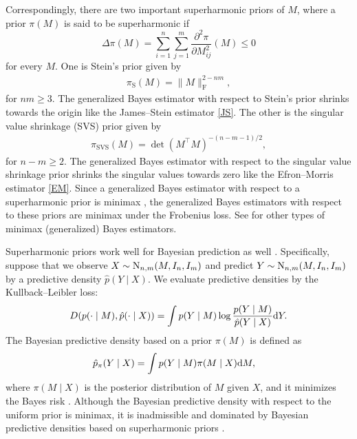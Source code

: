 \documentclass[11pt, a4paper]{article}
\theoremstyle{remark}
\begin{document}
Correspondingly, there are two important superharmonic priors of $M$, where a prior $\pi(M)$ is said to be superharmonic if
\[
    \Delta \pi (M) = \sum_{i=1}^n \sum_{j=1}^m \frac{\partial^2 \pi}{\partial M_{ij}^2} (M) \leq 0
\]
for every $M$.
One is Stein's prior \citep{stein1974estimation} given by
\begin{align}
\pi_{\mathrm{S}}(M)=\| M \|_{\mathrm{F}}^{2-nm}, \label{stein}
\end{align}
for $nm \geq 3$.
The generalized Bayes estimator with respect to Stein's prior shrinks towards the origin like the James--Stein estimator \eqref{JS}.
The other is the singular value shrinkage (SVS) prior \citep{matsuda2015singular} given by
\begin{align}
\pi_{\mathrm{SVS}}(M)=\det(M^\top M)^{-(n-m-1)/2}, \label{SVS}
\end{align}
for $n-m \geq 2$.
The generalized Bayes estimator with respect to the singular value shrinkage prior shrinks the singular values towards zero like the Efron--Morris estimator \eqref{EM}.
Since a generalized Bayes estimator with respect to a superharmonic prior is minimax \citep{stein1974estimation}, the generalized Bayes estimators with respect to these priors are minimax under the Frobenius loss.
See \cite{tsukuma2008admissibility,tsukuma2017proper} for other types of minimax (generalized) Bayes estimators.

Superharmonic priors work well for Bayesian prediction as well \citep{komaki2001shrinkage,george2006improved,matsuda2015singular}.
Specifically, suppose that we observe $X \sim {\rm N}_{n,m} (M, I_n, I_m)$ and predict ${Y} \sim {\rm N}_{n,m} (M, I_n, I_m)$ by a predictive density $\hat{p}({Y} \mid X)$. 
We evaluate predictive densities by the Kullback--Leibler loss:
\begin{align*}
	D ({p}(\cdot \mid M), \hat{p} (\cdot \mid X))
	= \int {p}({Y} \mid M) \log \frac{{p}({Y} \mid M)}{\hat{p} ({Y} \mid X)} {\rm d} {Y}. 
\end{align*}
The Bayesian predictive density based on a prior $\pi(M)$ is defined as
\begin{align*}
	\hat{p}_{\pi} ({Y} \mid X) & = \int {p} ({Y} \mid M) \pi (M \mid X) {\rm d} M,
\end{align*}
where $\pi(M \mid X)$ is the posterior distribution of $M$ given $X$, and it minimizes the Bayes risk \citep{aitchison1975goodness}.
Although the Bayesian predictive density with respect to the uniform prior is minimax, it is inadmissible and dominated by Bayesian predictive densities based on superharmonic priors \citep{komaki2001shrinkage,george2006improved}.
\end{document}
